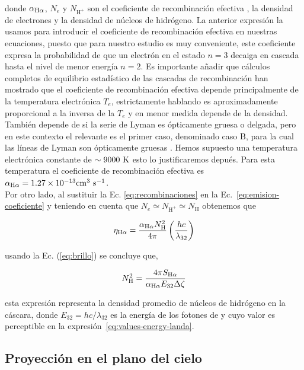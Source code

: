 donde  \(\alpha_{\mathrm{H}\alpha}\), \(N_{e}\) y \(N_{\text{H}^{+}}\)  son el coeficiente de recombinación efectiva \citep{Osterbrock:2006}, la densidad de electrones y la densidad de núcleos de hidrógeno. La anterior expresión la usamos para introducir el coeficiente de recombinación efectiva en nuestras ecuaciones, puesto que para nuestro estudio es muy conveniente, este coeficiente expresa la probabilidad de que un electrón en el estado \(n=3\) decaiga en cascada hasta el nivel de menor energía \(n=2\). Es importante añadir que cálculos completos de equilibrio estadístico de las cascadas de recombinación han mostrado que el coeficiente de recombinación efectiva depende principalmente de la temperatura electrónica \(T_{e}\), estrictamente hablando es aproximadamente proporcional a la inversa de la  \(T_{e}\) \citep{Pequignot:1991, Nussbaumer:1984} y en menor medida depende de la densidad. También depende de si la serie de Lyman es ópticamente gruesa o delgada, pero en este contexto el relevante es el primer caso, denominado caso B, para la cual las líneas de Lyman son ópticamente gruesas \citep{Hummer:1987}. Hemos supuesto una temperatura electrónica constante de \(\sim 9000~\mathrm{K} \) esto lo justificaremos depués. Para esta temperatura el coeficiente de recombinación efectiva es \(\alpha_{\mathrm{H}\alpha}=1.27\times 10^{-13}\mathrm{cm}^{3}~\text{s}^{-1} \).\\

Por otro lado, al sustituir la Ec. \ref{eq:recombinaciones} en la Ec.~\ref{eq:emision-coeficiente} y teniendo en cuenta que \(N_{e}\simeq N_{\text{H}^{+}} \simeq N_{\text{H}}\) obtenemos que

\begin{equation}
 \eta_{\mathrm{H}\alpha} =  \frac{\alpha_{\mathrm{H}\alpha}N_{\text{H}}^{2}}{4\pi} \left(\frac{hc}{\lambda_{32}}\right)  
\end{equation}

 usando la Ec. (\ref{eq:brillo}) se concluye que,

\begin{equation}
  \label{eq:densidad}
  N_{\text{H}}^{2}=\frac{4 \pi S_{\mathrm{H}\alpha}}{\alpha_{\mathrm{H}\alpha} E_{32} \Delta \zeta}
\end{equation}

\noindent esta expresión representa la densidad promedio de núcleos de hidrógeno en la cáscara, donde \( E_{32} = hc/\lambda_{32}\) es la energía de los fotones de \ha{} y cuyo valor es perceptible en la expresión~\ref{eq:values-energy-landa}. 


\subsection{Proyección en el plano del cielo}
\label{sec:pro}

